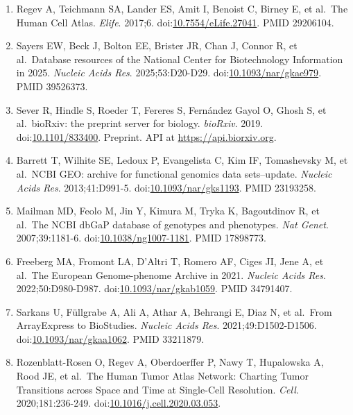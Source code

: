\documentclass[11pt]{article}
\begin{document}
\begin{enumerate}
  single-cell transcriptomes. \emph{Nat Biotechnol}. 2023;41:417-426.
  doi:\href{https://doi.org/10.1038/s41587-022-01468-y}{10.1038/s41587-022-01468-y}.
  PMID 36163550.
\item
  Regev A, Teichmann SA, Lander ES, Amit I, Benoist C, Birney E, et
  al.~The Human Cell Atlas. \emph{Elife}. 2017;6.
  doi:\href{https://doi.org/10.7554/eLife.27041}{10.7554/eLife.27041}.
  PMID 29206104.
\item
  Sayers EW, Beck J, Bolton EE, Brister JR, Chan J, Connor R, et
  al.~Database resources of the National Center for Biotechnology
  Information in 2025. \emph{Nucleic Acids Res}. 2025;53:D20-D29.
  doi:\href{https://doi.org/10.1093/nar/gkae979}{10.1093/nar/gkae979}.
  PMID 39526373.
\item
  Sever R, Hindle S, Roeder T, Fereres S, Fernández Gayol O, Ghosh S, et
  al.~bioRxiv: the preprint server for biology. \emph{bioRxiv}. 2019.
  doi:\href{https://doi.org/10.1101/833400}{10.1101/833400}. Preprint.
  API at \url{https://api.biorxiv.org}.
\item
  Barrett T, Wilhite SE, Ledoux P, Evangelista C, Kim IF, Tomashevsky M,
  et al.~NCBI GEO: archive for functional genomics data sets--update.
  \emph{Nucleic Acids Res}. 2013;41:D991-5.
  doi:\href{https://doi.org/10.1093/nar/gks1193}{10.1093/nar/gks1193}.
  PMID 23193258.
\item
  Mailman MD, Feolo M, Jin Y, Kimura M, Tryka K, Bagoutdinov R, et
  al.~The NCBI dbGaP database of genotypes and phenotypes. \emph{Nat
  Genet}. 2007;39:1181-6.
  doi:\href{https://doi.org/10.1038/ng1007-1181}{10.1038/ng1007-1181}.
  PMID 17898773.
\item
  Freeberg MA, Fromont LA, D'Altri T, Romero AF, Ciges JI, Jene A, et
  al.~The European Genome-phenome Archive in 2021. \emph{Nucleic Acids
  Res}. 2022;50:D980-D987.
  doi:\href{https://doi.org/10.1093/nar/gkab1059}{10.1093/nar/gkab1059}.
  PMID 34791407.
\item
  Sarkans U, Füllgrabe A, Ali A, Athar A, Behrangi E, Diaz N, et
  al.~From ArrayExpress to BioStudies. \emph{Nucleic Acids Res}.
  2021;49:D1502-D1506.
  doi:\href{https://doi.org/10.1093/nar/gkaa1062}{10.1093/nar/gkaa1062}.
  PMID 33211879.
\item
  Rozenblatt-Rosen O, Regev A, Oberdoerffer P, Nawy T, Hupalowska A,
  Rood JE, et al.~The Human Tumor Atlas Network: Charting Tumor
  Transitions across Space and Time at Single-Cell Resolution.
  \emph{Cell}. 2020;181:236-249.
  doi:\href{https://doi.org/10.1016/j.cell.2020.03.053}{10.1016/j.cell.2020.03.053}.

\end{enumerate}
\end{document}
